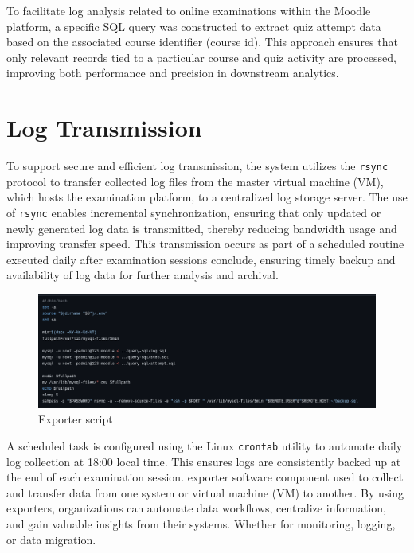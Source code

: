 To facilitate log analysis related to online examinations within the Moodle platform, a specific SQL query was constructed to extract quiz attempt data based on the associated course identifier (course id). This approach ensures that only relevant records tied to a particular course and quiz activity are processed, improving both performance and precision in downstream analytics.


\section{Log Transmission}

To support secure and efficient log transmission, the system utilizes the \texttt{rsync} protocol to transfer collected log files from the master virtual machine (VM), which hosts the examination platform, to a centralized log storage server. The use of \texttt{rsync} enables incremental synchronization, ensuring that only updated or newly generated log data is transmitted, thereby reducing bandwidth usage and improving transfer speed. This transmission occurs as part of a scheduled routine executed daily after examination sessions conclude, ensuring timely backup and availability of log data for further analysis and archival.


\begin{figure}[H] 
    \centering
    \includegraphics[width=14cm]{figure/export-sql.png}
    \caption{Exporter script}
    \label{fig:exporter}
\end{figure}

A scheduled task is configured using the Linux \texttt{crontab} utility to automate daily log collection at 18:00 local time. This ensures logs are consistently backed up at the end of each examination session. exporter software component used to collect and transfer data from one system or virtual machine (VM) to another. By using exporters, organizations can automate data workflows, centralize information, and gain valuable insights from their systems. Whether for monitoring, logging, or data migration.

